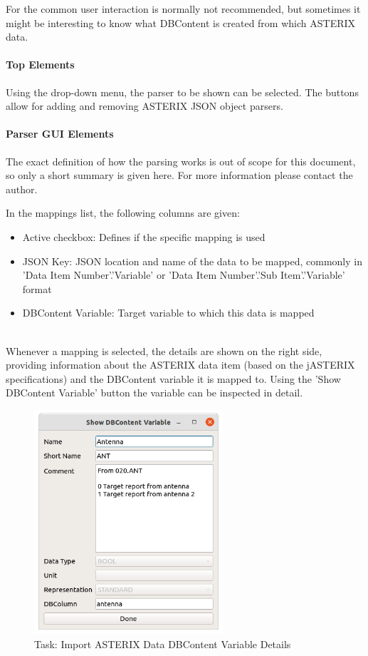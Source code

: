 For the common user interaction is normally not recommended, but sometimes it might be interesting to know what DBContent is created from which ASTERIX data.

\paragraph{Top Elements}

Using the drop-down menu, the parser to be shown can be selected. The buttons allow for adding and removing ASTERIX JSON object parsers.

\paragraph{Parser GUI Elements}

The exact definition of how the parsing works is out of scope for this document, so only a short summary is given here. For more information please contact the author.

In the mappings list, the following columns are given:

\begin{itemize}
\item Active checkbox: Defines if the specific mapping is used
\item JSON Key: JSON location and name of the data to be mapped, commonly in 'Data Item Number'.'Variable' or 'Data Item Number'.'Sub Item'.'Variable' format
\item DBContent Variable: Target variable to which this data is mapped
\end{itemize}
\ \\

Whenever a mapping is selected, the details are shown on the right side, providing information about the ASTERIX data item (based on the jASTERIX specifications) and the DBContent variable it is mapped to. 
Using the 'Show DBContent Variable' button the variable can be inspected in detail.

\begin{figure}[H]
  \center
    \includegraphics[width=7cm]{figures/asterix_import_data_dbcont_var_details.png}
  \caption{Task: Import ASTERIX Data DBContent Variable Details}
\end{figure}

